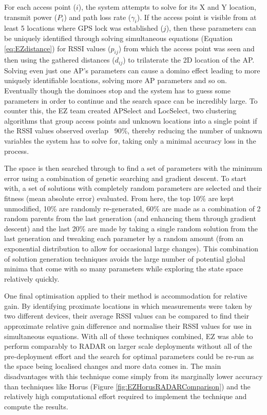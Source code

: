 \documentclass{UoYCSproject}
\begin{document}
                For each access point ($i$), the system attempts to solve for its X and Y location, transmit power ($P_i$) and path loss rate ($\gamma_i$). If the access point is visible from at least 5 locations where GPS lock was established ($j$), then these parameters can be uniquely identified through solving simultaneous equations (Equation \ref{eq:EZdistance}) for RSSI values ($p_{ij}$) from which the access point was seen and then using the gathered distances ($d_{ij}$) to trilaterate the 2D location of the AP. Solving even just one AP's parameters can cause a domino effect leading to more uniquely identifiable locations, solving more AP parameters and so on. Eventually though the dominoes stop and the system has to guess some parameters in order to continue and the search space can be incredibly large. To counter this, the EZ team created APSelect and LocSelect, two clustering algorithms that group access points and unknown locations into a single point if the RSSI values observed overlap ~90\%, thereby reducing the number of unknown variables the system has to solve for, taking only a minimal accuracy loss in the process.
                
                The space is then searched through to find a set of parameters with the minimum error using a combination of genetic searching and gradient descent. To start with, a set of solutions with completely random parameters are selected and their fitness (mean absolute error) evaluated. From here, the top 10\% are kept unmodified, 10\% are randomly re-generated, 60\% are made as a combination of 2 random parents from the last generation (and enhancing them through gradient descent) and the last 20\% are made by taking a single random solution from the last generation and tweaking each parameter by a random amount (from an exponential distribution to allow for occasional large changes). This combination of solution generation techniques avoids the large number of potential global minima that come with so many parameters while exploring the state space relatively quickly.
                
                One final optimisation applied to their method is accommodation for relative gain. By identifying proximate locations in which measurements were taken by two different devices, their average RSSI values can be compared to find their approximate relative gain difference and normalise their RSSI values for use in simultaneous equations. With all of these techniques combined, EZ was able to perform comparably to RADAR on larger scale deployments without all of the pre-deployment effort and the search for optimal parameters could be re-run as the space being localised changes and more data comes in. The main disadvantages with this technique come simply from its marginally lower accuracy than techniques like Horus (Figure \ref{fig:EZHorusRADARComparison}) and the relatively high computational effort required to implement the technique and compute the results.
                
\end{document}
